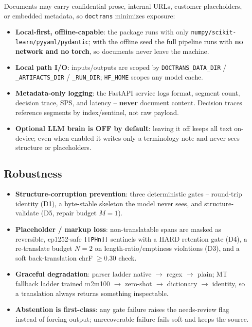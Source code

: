 \documentclass[12pt,a4paper]{article}
\begin{document}
Documents may carry confidential prose, internal URLs, customer placeholders, or embedded metadata, so \texttt{doctrans} minimizes exposure:
\begin{itemize}
  \item \textbf{Local-first, offline-capable}: the package runs with only \texttt{numpy/scikit-learn/pyyaml/pydantic}; with the offline seed the full pipeline runs with \textbf{no network and no torch}, so documents never leave the machine.
  \item \textbf{Local path I/O}: inputs/outputs are scoped by \texttt{DOCTRANS\_DATA\_DIR} / \texttt{\_ARTIFACTS\_DIR} / \texttt{\_RUN\_DIR}; \texttt{HF\_HOME} scopes any model cache.
  \item \textbf{Metadata-only logging}: the FastAPI service logs format, segment count, decision trace, SPS, and latency -- \textbf{never} document content. Decision traces reference segments by index/sentinel, not raw payload.
  \item \textbf{Optional LLM brain is OFF by default}: leaving it off keeps all text on-device; even when enabled it writes only a terminology note and never sees structure or placeholders.
\end{itemize}

\subsection{Robustness}

\begin{itemize}\setlength\itemsep{0.15em}
  \item \textbf{Structure-corruption prevention}: three deterministic gates -- round-trip identity (D1), a byte-stable skeleton the model never sees, and structure-validate (D5, repair budget $M=1$).
  \item \textbf{Placeholder / markup loss}: non-translatable spans are masked as reversible, cp1252-safe \texttt{[[PHn]]} sentinels with a HARD retention gate (D4), a re-translate budget $N=2$ on length-ratio/emptiness violations (D3), and a soft back-translation chrF $\geq 0.30$ check.
  \item \textbf{Graceful degradation}: parser ladder native $\rightarrow$ regex $\rightarrow$ plain; MT fallback ladder trained m2m100 $\rightarrow$ zero-shot $\rightarrow$ dictionary $\rightarrow$ identity, so a translation always returns something inspectable.
  \item \textbf{Abstention is first-class}: any gate failure raises the needs-review flag instead of forcing output; unrecoverable failure fails soft and keeps the source.
\end{itemize}
\end{document}
